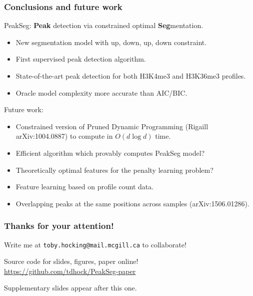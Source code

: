 \documentclass{beamer}
\begin{document}
\begin{frame}
  \frametitle{Conclusions and future work}
  PeakSeg: \textbf{Peak} detection via constrained optimal
  \textbf{Seg}mentation.
  \begin{itemize}
  \item New segmentation model with up, down, up, down constraint.
  \item First supervised peak detection algorithm.
  \item State-of-the-art peak detection for both H3K4me3 and H3K36me3
    profiles.
  \item Oracle model complexity more accurate
    than AIC/BIC.
  \end{itemize}
  Future work:
  \begin{itemize}
  \item Constrained version of Pruned Dynamic Programming (Rigaill
    arXiv:1004.0887) to compute in $O(d\log d)$ time.
  \item Efficient algorithm which provably computes PeakSeg model?
  \item Theoretically optimal features for the penalty learning
    problem?
  \item Feature learning based on profile count data.
  \item Overlapping peaks at the same positions across samples
    (arXiv:1506.01286).
  \end{itemize}
\end{frame}

\begin{frame}
  \frametitle{Thanks for your attention!}
  Write me at \alert{\texttt{toby.hocking@mail.mcgill.ca}} to collaborate!

  \vskip 1cm

  Source code for slides, figures, paper online!\\
  \small
  \url{https://github.com/tdhock/PeakSeg-paper}
  \vskip 1cm

  Supplementary slides appear after this one.

\end{frame}
\end{document}
